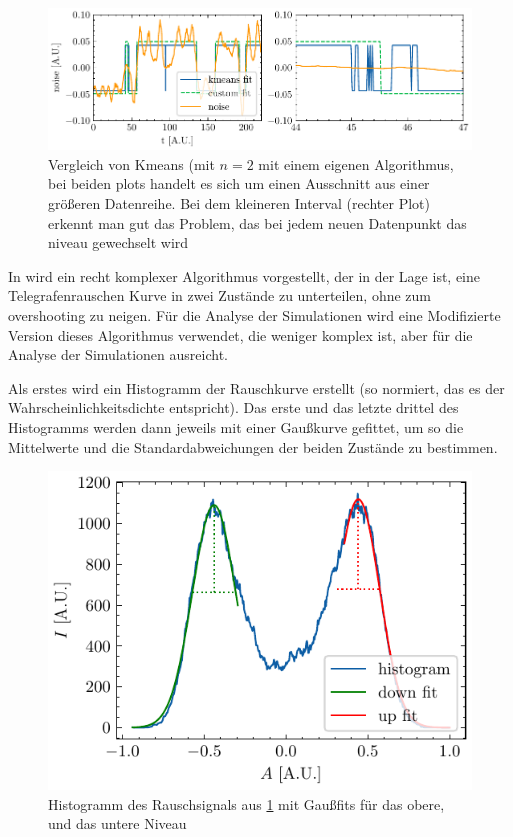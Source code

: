 \documentclass[main.tex]{subfiles}
\begin{document}
\begin{figure}[h]
    \centering
    \includegraphics{bilder/plots/theo-vis/telegraph_fit_comp.pdf}
    \caption{Vergleich von Kmeans (mit \(n=2\) mit einem eigenen Algorithmus, bei beiden plots handelt es sich um einen Ausschnitt aus einer größeren Datenreihe. Bei dem kleineren Interval (rechter Plot) erkennt man gut das Problem, das bei jedem neuen Datenpunkt das niveau gewechselt wird}\label{fig:fit_comp}
\end{figure}


In \cite{random-telegraph-analysis} wird ein recht komplexer Algorithmus vorgestellt, der in der Lage ist, eine Telegrafenrauschen Kurve in zwei Zustände zu unterteilen, ohne zum overshooting zu neigen. Für die Analyse der Simulationen wird eine Modifizierte Version dieses Algorithmus verwendet, die weniger komplex ist, aber für die Analyse der Simulationen ausreicht.


Als erstes wird ein Histogramm der Rauschkurve erstellt (so normiert, das es der Wahrscheinlichkeitsdichte entspricht). 
Das erste und das letzte drittel des Histogramms werden dann jeweils mit einer Gaußkurve gefittet, um so die Mittelwerte und die Standardabweichungen der beiden Zustände zu bestimmen.

\begin{figure}[h]
    \centering
    \includegraphics{bilder/plots/theo-vis/hist_fit.pdf}
    \caption{Histogramm des Rauschsignals aus \cref{fig:fit_comp} mit Gaußfits für das obere, und das untere Niveau}
\end{figure}
\end{document}
